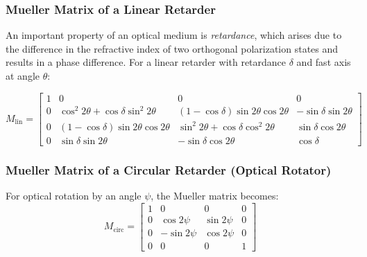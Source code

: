 \subsubsection{Mueller Matrix of a Linear Retarder}
An important property of an optical medium is \textit{retardance}, which arises due to the difference in the refractive index of two orthogonal polarization states and results in a phase difference. For a linear retarder with retardance $\delta$ and fast axis at angle $\theta$:

\begin{equation}
M_{\text{lin}} =
\begin{bmatrix}
1 & 0 & 0 & 0 \\
0 & \cos^2 2\theta + \cos\delta \sin^2 2\theta & (1-\cos\delta)\sin 2\theta \cos 2\theta & -\sin\delta \sin 2\theta \\
0 & (1-\cos\delta)\sin 2\theta \cos 2\theta & \sin^2 2\theta + \cos\delta \cos^2 2\theta & \sin\delta \cos 2\theta \\
0 & \sin\delta \sin 2\theta & -\sin\delta \cos 2\theta & \cos\delta
\end{bmatrix}
\end{equation}

\subsubsection{Mueller Matrix of a Circular Retarder (Optical Rotator)}
For optical rotation by an angle $\psi$, the Mueller matrix becomes:
\begin{equation}
M_{\text{circ}} =
\begin{bmatrix}
1 & 0 & 0 & 0 \\
0 & \cos 2\psi & \sin 2\psi & 0 \\
0 & -\sin 2\psi & \cos 2\psi & 0 \\
0 & 0 & 0 & 1
\end{bmatrix}
\end{equation}

